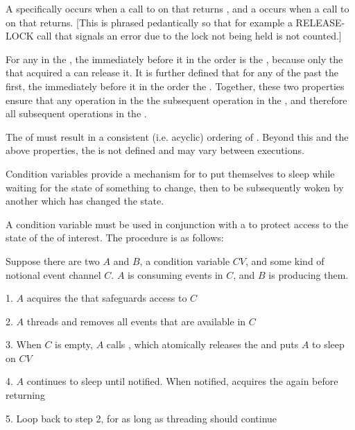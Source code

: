 A  specifically occurs when a call to
 on that  returns , and a
 occurs when a call to  on
that  returns. [This is phrased pedantically so that for
example a RELEASE-LOCK call that signals an error due to the lock not
being held is not counted.]

For any  in the , the
 immediately before it in the order is
 the , because only the
 that acquired a  can release it. It is
further defined that for any  of the
 past the first, the  immediately before
it in the order  the . Together, these two properties ensure that any
operation in the   the
subsequent operation in the , and therefore
 all subsequent operations in the
.

The  of  must result in a
consistent (i.e. acyclic)  ordering of
. Beyond this and the above properties, the
 is not defined and may vary between
executions.

\endsubsubsection%

\endsubsection%


Condition variables provide a mechanism for  to put
themselves to sleep while waiting for the state of something to
change, then to be subsequently woken by another  which
has changed the state.

A condition variable must be used in conjunction with a  to
protect access to the state of the  of interest. The
procedure is as follows:

Suppose there are two  $A$ and $B$, a condition variable
$CV$, and some kind of notional event channel $C$. $A$ is consuming
events in $C$, and $B$ is producing them.

\beginlist
\item{1.} $A$ acquires the  that safeguards access to $C$
\item{2.} $A$ threads and removes all
  events that are available in $C$
\item{3.} When $C$ is empty, $A$ calls , which
  atomically releases the  and puts $A$ to sleep on $CV$
\item{4.} $A$ continues to sleep until notified. When notified,
   acquires the  again before
  returning
\item{5.} Loop back to step 2, for as long as threading should
  continue
\endlist

